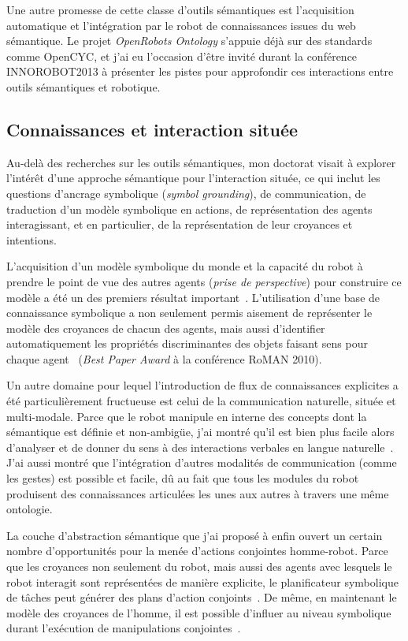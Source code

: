 \documentclass[a4paper]{article}
\begin{document}
Une autre promesse de cette classe d'outils sémantiques est l'acquisition
automatique et l'intégration par le robot de connaissances issues du web
sémantique. Le projet \emph{OpenRobots Ontology} s'appuie déjà sur des
standards comme {\sc OpenCYC}, et j'ai eu l'occasion d'être invité durant la
conférence INNOROBOT2013 à présenter les pistes pour approfondir ces
interactions entre outils sémantiques et robotique.

\subsection{Connaissances et interaction située%
  \label{semantic-tools-for-grounded-interaction}%
}

Au-delà des recherches sur les outils sémantiques, mon doctorat visait à
explorer l'intérêt d'une approche sémantique pour l'interaction située, ce qui
inclut les questions d'ancrage symbolique (\emph{symbol grounding}), de
communication, de traduction d'un modèle symbolique en actions, de
représentation des agents interagissant, et en particulier, de la représentation
de leur croyances et intentions.

L'acquisition d'un modèle symbolique du monde et la capacité du robot à prendre
le point de vue des autres agents (\emph{prise de perspective}) pour construire
ce modèle a été un des premiers résultat important~\cite{Lemaignan2011}.
L'utilisation d'une base de connaissance symbolique a non seulement permis
aisement de représenter le modèle des croyances de chacun des agents, mais aussi
d'identifier automatiquement les propriétés discriminantes des objets faisant
sens pour chaque agent~\cite{ros2010which} (\emph{Best Paper Award} à la
conférence RoMAN 2010).

Un autre domaine pour lequel l'introduction de flux de connaissances explicites
a été particulièrement fructueuse est celui de la communication naturelle,
située et multi-modale. Parce que le robot manipule en interne des concepts dont
la sémantique est définie et non-ambigüe, j'ai montré qu'il est bien plus facile
alors d'analyser et de donner du sens à des interactions verbales en langue
naturelle~\cite{Lemaignan2011a, Ros2010a, lemaignan2011what,
lemaignan2011dialogue, lemaignan2013talking}. J'ai aussi montré que
l'intégration d'autres modalités de communication (comme les gestes) est
possible et facile, dû au fait que tous les modules du robot produisent des
connaissances articulées les unes aux autres à travers une même ontologie.


La couche d'abstraction sémantique que j'ai proposé à enfin ouvert un certain
nombre d'opportunités pour la menée d'actions conjointes homme-robot. Parce que
les croyances non seulement du robot, mais aussi des agents avec lesquels le
robot interagit sont représentées de manière explicite, le planificateur
symbolique de tâches peut générer des plans d'action
conjoints~\cite{alami2011when, Lemaignan2012, clodic2013on}. De même, en
maintenant le modèle des croyances de l'homme, il est possible d'influer au
niveau symbolique durant l'exécution de manipulations
conjointes~\cite{gharbi2013natural}.
\end{document}
